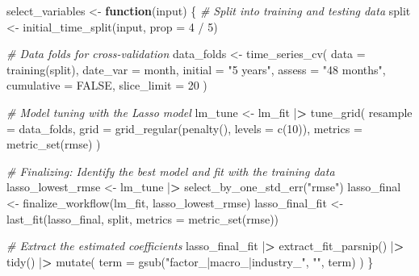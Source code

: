 \documentclass[
]{krantz}
\newenvironment{Shaded}{\begin{snugshade}}{\end{snugshade}}
\newcommand{\AttributeTok}[1]{\textcolor[rgb]{0.61,0.61,0.61}{#1}}
\newcommand{\CommentTok}[1]{\textcolor[rgb]{0.37,0.37,0.37}{\textit{#1}}}
\newcommand{\ConstantTok}[1]{\textcolor[rgb]{0,0,0}{#1}}
\newcommand{\ControlFlowTok}[1]{\textcolor[rgb]{0.27,0.27,0.27}{\textbf{#1}}}
\newcommand{\DecValTok}[1]{\textcolor[rgb]{0.06,0.06,0.06}{#1}}
\newcommand{\ErrorTok}[1]{\textcolor[rgb]{0.14,0.14,0.14}{\textbf{#1}}}
\newcommand{\FunctionTok}[1]{\textcolor[rgb]{0,0,0}{#1}}
\newcommand{\NormalTok}[1]{#1}
\newcommand{\OtherTok}[1]{\textcolor[rgb]{0.37,0.37,0.37}{#1}}
\newcommand{\SpecialCharTok}[1]{\textcolor[rgb]{0,0,0}{#1}}
\newcommand{\StringTok}[1]{\textcolor[rgb]{0.5,0.5,0.5}{#1}}
\begin{document}
\begin{Shaded}
\begin{Highlighting}[]
\NormalTok{select\_variables }\OtherTok{\textless{}{-}} \ControlFlowTok{function}\NormalTok{(input) \{}
  \CommentTok{\# Split into training and testing data}
\NormalTok{  split }\OtherTok{\textless{}{-}} \FunctionTok{initial\_time\_split}\NormalTok{(input, }\AttributeTok{prop =} \DecValTok{4} \SpecialCharTok{/} \DecValTok{5}\NormalTok{)}

  \CommentTok{\# Data folds for cross{-}validation}
\NormalTok{  data\_folds }\OtherTok{\textless{}{-}} \FunctionTok{time\_series\_cv}\NormalTok{(}
    \AttributeTok{data =} \FunctionTok{training}\NormalTok{(split),}
    \AttributeTok{date\_var =}\NormalTok{ month,}
    \AttributeTok{initial =} \StringTok{"5 years"}\NormalTok{,}
    \AttributeTok{assess =} \StringTok{"48 months"}\NormalTok{,}
    \AttributeTok{cumulative =} \ConstantTok{FALSE}\NormalTok{,}
    \AttributeTok{slice\_limit =} \DecValTok{20}
\NormalTok{  )}

  \CommentTok{\# Model tuning with the Lasso model}
\NormalTok{  lm\_tune }\OtherTok{\textless{}{-}}\NormalTok{ lm\_fit }\SpecialCharTok{|}\ErrorTok{\textgreater{}}
    \FunctionTok{tune\_grid}\NormalTok{(}
      \AttributeTok{resample =}\NormalTok{ data\_folds,}
      \AttributeTok{grid =} \FunctionTok{grid\_regular}\NormalTok{(}\FunctionTok{penalty}\NormalTok{(), }\AttributeTok{levels =} \FunctionTok{c}\NormalTok{(}\DecValTok{10}\NormalTok{)),}
      \AttributeTok{metrics =} \FunctionTok{metric\_set}\NormalTok{(rmse)}
\NormalTok{    )}

  \CommentTok{\# Finalizing: Identify the best model and fit with the training data}
\NormalTok{  lasso\_lowest\_rmse }\OtherTok{\textless{}{-}}\NormalTok{ lm\_tune }\SpecialCharTok{|}\ErrorTok{\textgreater{}} \FunctionTok{select\_by\_one\_std\_err}\NormalTok{(}\StringTok{"rmse"}\NormalTok{)}
\NormalTok{  lasso\_final }\OtherTok{\textless{}{-}} \FunctionTok{finalize\_workflow}\NormalTok{(lm\_fit, lasso\_lowest\_rmse)}
\NormalTok{  lasso\_final\_fit }\OtherTok{\textless{}{-}} \FunctionTok{last\_fit}\NormalTok{(lasso\_final, split, }\AttributeTok{metrics =} \FunctionTok{metric\_set}\NormalTok{(rmse))}

  \CommentTok{\# Extract the estimated coefficients}
\NormalTok{  lasso\_final\_fit }\SpecialCharTok{|}\ErrorTok{\textgreater{}}
    \FunctionTok{extract\_fit\_parsnip}\NormalTok{() }\SpecialCharTok{|}\ErrorTok{\textgreater{}}
    \FunctionTok{tidy}\NormalTok{() }\SpecialCharTok{|}\ErrorTok{\textgreater{}}
    \FunctionTok{mutate}\NormalTok{(}
      \AttributeTok{term =} \FunctionTok{gsub}\NormalTok{(}\StringTok{"factor\_|macro\_|industry\_"}\NormalTok{, }\StringTok{""}\NormalTok{, term)}
\NormalTok{    )}
\NormalTok{\}}


\end{Highlighting}
\end{Shaded}
\end{document}
